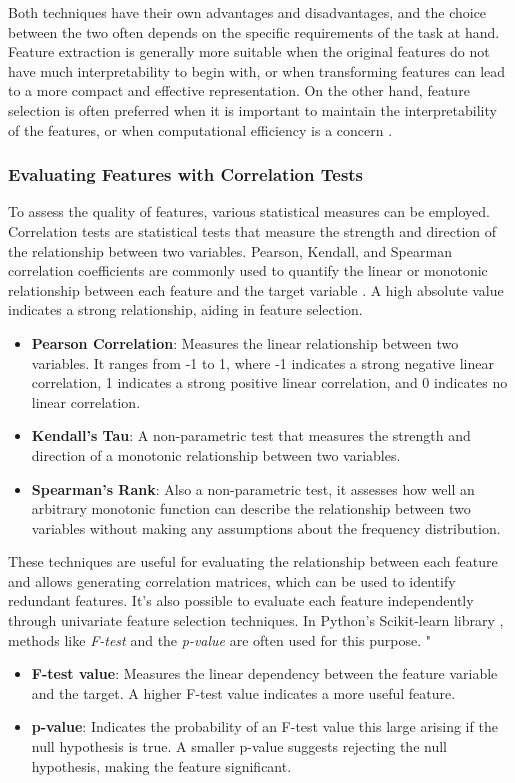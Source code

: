     Both techniques have their own advantages and disadvantages, and the choice between the two often depends on the specific requirements of the task at hand. Feature extraction is generally more suitable when the original features do not have much interpretability to begin with, or when transforming features can lead to a more compact and effective representation. On the other hand, feature selection is often preferred when it is important to maintain the interpretability of the features, or when computational efficiency is a concern \cite{FeatureEngineeringMadeEasy18}.

    \subsubsection{Evaluating Features with Correlation Tests}
    To assess the quality of features, various statistical measures can be employed. Correlation tests are statistical tests that measure the strength and direction of the relationship between two variables. Pearson, Kendall, and Spearman correlation coefficients are commonly used to quantify the linear or monotonic relationship between each feature and the target variable \cite{StatisticalMethodsInPractice09}. A high absolute value indicates a strong relationship, aiding in feature selection.

    \begin{itemize}
        \item \textbf{Pearson Correlation}: Measures the linear relationship between two variables. It ranges from -1 to 1, where -1 indicates a strong negative linear correlation, 1 indicates a strong positive linear correlation, and 0 indicates no linear correlation.
        \item \textbf{Kendall's Tau}: A non-parametric test that measures the strength and direction of a monotonic relationship between two variables.
        \item \textbf{Spearman's Rank}: Also a non-parametric test, it assesses how well an arbitrary monotonic function can describe the relationship between two variables without making any assumptions about the frequency distribution.
    \end{itemize}

    These techniques are useful for evaluating the relationship between each feature and allows generating correlation matrices, which can be used to identify redundant features. It's also possible to evaluate each feature independently through univariate feature selection techniques. In Python's Scikit-learn library \cite{ScikitLearn}, methods like \textit{F-test} and the \textit{p-value} are often used for this purpose.
"
    \begin{itemize}
        \item \textbf{F-test value}: Measures the linear dependency between the feature variable and the target. A higher F-test value indicates a more useful feature.
        \item \textbf{p-value}: Indicates the probability of an F-test value this large arising if the null hypothesis is true. A smaller p-value suggests rejecting the null hypothesis, making the feature significant.
    \end{itemize}

